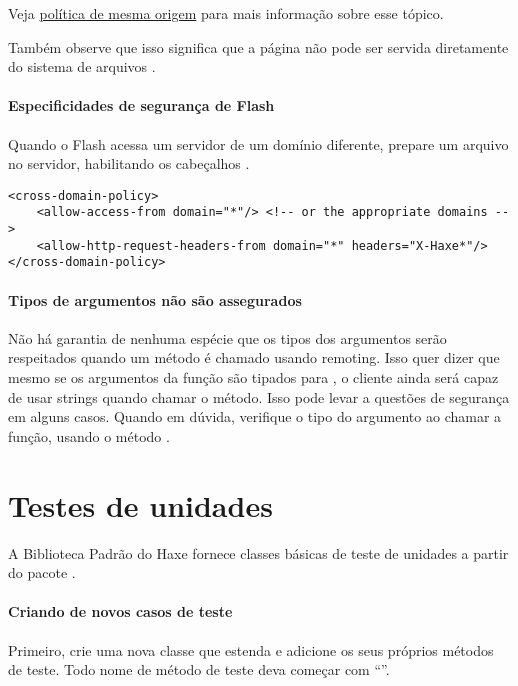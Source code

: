 {Veja  \href{http://pt.wikipedia.org/wiki/Pol\%C3\%ADtica_de_mesma_origem}{política de mesma origem} para mais informação sobre esse tópico.

Também observe que isso significa que a página não pode ser servida diretamente do sistema de arquivos .

\paragraph{Especificidades de segurança de Flash}

Quando o Flash acessa um servidor de um domínio diferente, prepare um arquivo  no servidor, habilitando os cabeçalhos .

\begin{lstlisting} 
<cross-domain-policy>
	<allow-access-from domain="*"/> <!-- or the appropriate domains -->
	<allow-http-request-headers-from domain="*" headers="X-Haxe*"/>
</cross-domain-policy>
\end{lstlisting} 

\paragraph{Tipos de argumentos não são assegurados}

Não há garantia de nenhuma espécie que os tipos dos argumentos serão respeitados quando um método é chamado usando remoting.
Isso quer dizer que mesmo se os argumentos da função  são tipados para , o cliente ainda será capaz de usar strings quando chamar o método.
Isso pode levar a questões de segurança em alguns casos. Quando em dúvida, verifique o tipo do argumento ao chamar a função, usando o método .

\section{Testes de unidades}
\label{std-unit-testing}

A Biblioteca Padrão do Haxe fornece classes básicas de teste de unidades a partir do pacote . 

\paragraph{Criando de novos casos de teste}

Primeiro, crie uma nova classe que estenda  e adicione os seus próprios métodos de teste. Todo nome de método de teste deva começar com ``''.

}
